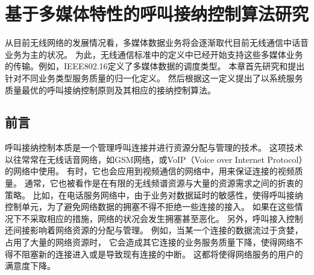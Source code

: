 \graphicspath{ {../body/cacop_figures/}}
\chapter{基于多媒体特性的呼叫接纳控制算法研究}
\label{chap_cacop}

从目前无线网络的发展情况看，多媒体数据业务将会逐渐取代目前无线通信中话音业务为主的状况。
为此，无线通信标准中的定义中已经开始支持这些多媒体业务的传输。例如，IEEE802.16定义了多媒体数据的调度类型。
本章首先研究和提出针对不同业务类型服务质量的归一化定义。
然后根据这一定义提出了以系统服务质量最优的呼叫接纳控制原则及其相应的接纳控制算法。

\section{前言}
呼叫接纳控制本质是一个管理呼叫连接并进行资源分配与管理的技术。
这项技术以往常常在无线话音网络，如GSM网络，或VoIP（Voice over Internet Protocol）的网络中使用\cite{Perros1996}\cite{Mase2004}。
有时，它也会应用到视频通信的网络中，用来保证连接的视频质量\cite{Systems_2001}\cite{Y-G-Fang.TVT.2002}\cite{Y-Xiao.IEICE.TC.2001}。
通常，它也被看作是在有限的无线频谱资源与大量的资源需求之间的折衷的策略。
比如，在电话服务网络中，由于业务对数据延时的敏感性，使得呼叫接纳控制单元，为了避免网络数据的拥塞不得不拒绝一些连接的接入。
如果在这些情况下不采取相应的措施，网络的状况会发生拥塞甚至恶化。
另外，呼叫接入控制还间接影响着网络资源的分配与管理。
例如，当某一个连接的数据流过于贪婪，占用了大量的网络资源时，
它会造成其它连接的业务服务质量下降，使得网络不得不阻塞新的连接进入或是导致现有连接的中断。
这都将使得网络服务的用户的满意度下降。

